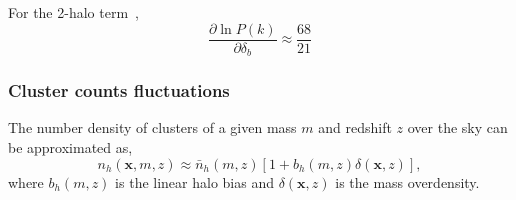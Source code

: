 \documentclass[preprint]{aastex}
\newcommand{\xv}{\mathbf{x}}
\newcommand{\nbar}{\bar{n}}
\begin{document}
For the 2-halo term~\citep[eq. 39 of][]{takada2013}, 
\begin{equation}
	\frac{\partial \ln P(k)}{\partial \delta_b} \approx 
	\frac{68}{21}
\end{equation}

\subsubsection{Cluster counts fluctuations}
The number density of clusters of a given mass $m$ and redshift $z$ over the 
sky can be approximated as,
\begin{equation}
	n_{h}(\xv, m, z) \approx \nbar_{h}(m, z)
	\left[1 + b_{h}(m,z) \delta(\xv, z)\right],
\end{equation}
where $b_{h}(m,z)$ is the linear halo bias and
$\delta(\xv,z)$ is the mass overdensity.




\end{document}
